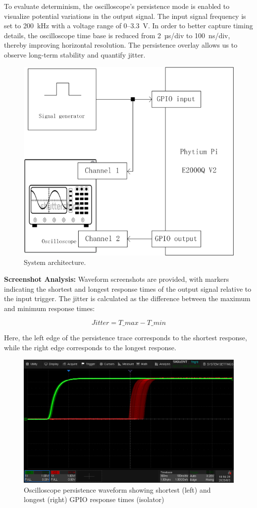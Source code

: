 \documentclass[letterpaper]{article}
\begin{document}
To evaluate determinism, the oscilloscope’s persistence mode is enabled to visualize potential variations in the output signal. The input signal frequency is set to 200~kHz with a voltage range of 0--3.3~V. In order to better capture timing details, the oscilloscope time base is reduced from 2~µs/div to 100~ns/div, thereby improving horizontal resolution. The persistence overlay allows us to observe long-term stability and quantify jitter.

\begin{figure}
    \centering
    \includegraphics[width=0.85\columnwidth]{evaluation.jpg}
    \caption{System architecture.}
    \label{fig:oscilloscope}
\end{figure}


\textbf{Screenshot Analysis:}  
Waveform screenshots are provided, with markers indicating the shortest and longest response times of the output signal relative to the input trigger. The jitter is calculated as the difference between the maximum and minimum response times:  

\[
Jitter = T\_{max} - T\_{min}
\]


Here, the left edge of the persistence trace corresponds to the shortest response, while the right edge corresponds to the longest response.  

\begin{figure}[h]
  \centering
  \includegraphics[width=0.8\linewidth]{figures/islintgpio.png}
  \caption{Oscilloscope persistence waveform showing shortest (left) and longest (right) GPIO response times (isolator)}
  \label{fig:islintgpio}
\end{figure}
\end{document}
